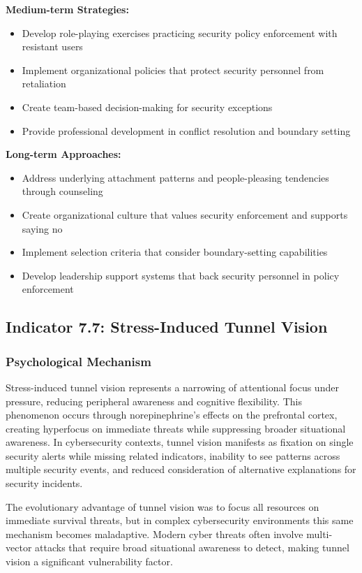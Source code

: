 \documentclass[11pt,a4paper]{article}
\begin{document}
\textbf{Medium-term Strategies:}
\begin{itemize}
\item Develop role-playing exercises practicing security policy enforcement with resistant users
\item Implement organizational policies that protect security personnel from retaliation
\item Create team-based decision-making for security exceptions
\item Provide professional development in conflict resolution and boundary setting
\end{itemize}

\textbf{Long-term Approaches:}
\begin{itemize}
\item Address underlying attachment patterns and people-pleasing tendencies through counseling
\item Create organizational culture that values security enforcement and supports saying no
\item Implement selection criteria that consider boundary-setting capabilities
\item Develop leadership support systems that back security personnel in policy enforcement
\end{itemize}

\subsection{Indicator 7.7: Stress-Induced Tunnel Vision}

\subsubsection{Psychological Mechanism}

Stress-induced tunnel vision represents a narrowing of attentional focus under pressure, reducing peripheral awareness and cognitive flexibility\cite{easterbrook1959}. This phenomenon occurs through norepinephrine's effects on the prefrontal cortex, creating hyperfocus on immediate threats while suppressing broader situational awareness\cite{arnsten2009}. In cybersecurity contexts, tunnel vision manifests as fixation on single security alerts while missing related indicators, inability to see patterns across multiple security events, and reduced consideration of alternative explanations for security incidents\cite{tunnelvision2023}.

The evolutionary advantage of tunnel vision was to focus all resources on immediate survival threats, but in complex cybersecurity environments this same mechanism becomes maladaptive\cite{evolution2021}. Modern cyber threats often involve multi-vector attacks that require broad situational awareness to detect, making tunnel vision a significant vulnerability factor\cite{multivector2022}.
\end{document}
